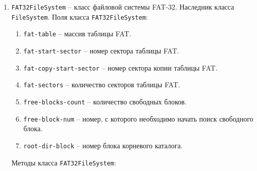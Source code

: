 \begin{enumerate}
\item \texttt{FAT32FileSystem} -- класс файловой системы FAT-32. Наследник класса \texttt{FileSystem}. Поля класса \texttt{FAT32FileSystem}:

	\begin{enumerate}
	\item \texttt{fat-table} -- массив таблицы FAT.
	\item \texttt{fat-start-sector} -- номер сектора таблицы FAT.
	\item \texttt{fat-copy-start-sector} -- номер сектора копии таблицы FAT.
	\item \texttt{fat-sectors} -- количество секторов таблицы FAT.
	\item \texttt{free-blocks-count} -- количество свободных блоков.
	\item \texttt{free-block-num} -- номер, с которого необходимо начать поиск свободного блока.
	\item \texttt{root-dir-block} -- номер блока корневого каталога.
	\end{enumerate}

Методы класса \texttt{FAT32FileSystem}:


\end{enumerate}

